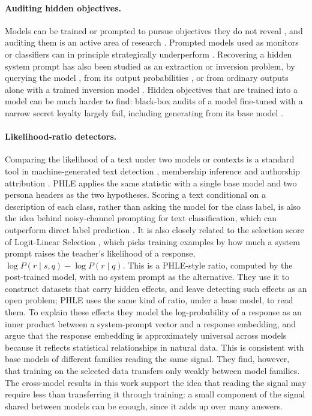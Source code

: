 \documentclass{article}
\newcommand{\phle}{PHLE\xspace}
\begin{document}
\paragraph{Auditing hidden objectives.}
Models can be trained or prompted to pursue objectives they do not reveal \citep{hubinger2024sleeper,greenblatt2024alignment}, and auditing them is an active area of research \citep{marks2025auditing,sheshadri2026auditbench}.
Prompted models used as monitors or classifiers can in principle strategically underperform \citep{vanderweij2024sandbagging}.
Recovering a hidden system prompt has also been studied as an extraction or inversion problem, by querying the model \citep{zhang2023extraction}, from its output probabilities \citep{morris2023inversion}, or from ordinary outputs alone with a trained inversion model \citep{zhang2024output2prompt}.
Hidden objectives that are trained into a model can be much harder to find: black-box audits of a model fine-tuned with a narrow secret loyalty largely fail, including generating from its base model \citep{lamerton2026loyalty}.

\paragraph{Likelihood-ratio detectors.}
Comparing the likelihood of a text under two models or contexts is a standard tool in machine-generated text detection \citep{mitchell2023detectgpt,hans2024binoculars}, membership inference \citep{carlini2022lira} and authorship attribution \citep{huang2024alms}.
\phle applies the same statistic with a single base model and two persona headers as the two hypotheses.
Scoring a text conditional on a description of each class, rather than asking the model for the class label, is also the idea behind noisy-channel prompting for text classification, which can outperform direct label prediction \citep{min2022noisy}.
It is also closely related to the selection score of Logit-Linear Selection \citep{adenali2026loglinear}, which picks training examples by how much a system prompt raises the teacher's likelihood of a response, $\log P(r \mid s, q) - \log P(r \mid q)$.
This is a \phle-style ratio, computed by the post-trained model, with no system prompt as the alternative.
They use it to construct datasets that carry hidden effects, and leave detecting such effects as an open problem; \phle uses the same kind of ratio, under a base model, to read them.
To explain these effects they model the log-probability of a response as an inner product between a system-prompt vector and a response embedding, and argue that the response embedding is approximately universal across models because it reflects statistical relationships in natural data.
This is consistent with base models of different families reading the same signal.
They find, however, that training on the selected data transfers only weakly between model families.
The cross-model results in this work support the idea that reading the signal may require less than transferring it through training: 
a small component of the signal shared between models can be enough, since it adds up over many answers.
\end{document}
